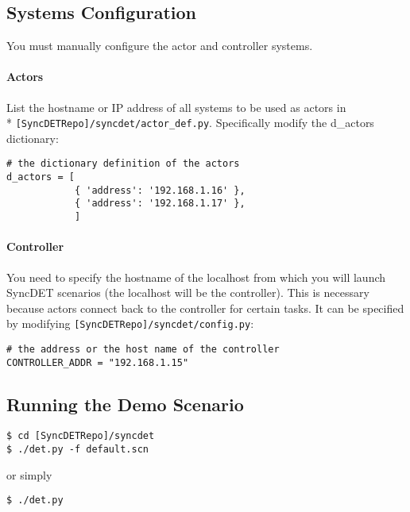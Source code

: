 \subsection{Systems Configuration}
You must manually configure the actor and controller systems. 

\paragraph{Actors} 
List the hostname or IP address of all systems to be used as actors in \\*
{\tt [SyncDETRepo]/syncdet/actor\_def.py}. Specifically modify the d\_actors
dictionary:
\begin{verbatim}
# the dictionary definition of the actors
d_actors = [
            { 'address': '192.168.1.16' },
            { 'address': '192.168.1.17' },
            ]
\end{verbatim}

\paragraph{Controller} 
You need to specify the hostname of the localhost from which you will launch
SyncDET scenarios (the localhost will be the controller). This is necessary
because actors connect back to the controller for certain tasks. It can be
specified by modifying {\tt [SyncDETRepo]/syncdet/config.py}:
\begin{verbatim}
# the address or the host name of the controller
CONTROLLER_ADDR = "192.168.1.15"
\end{verbatim}

\subsection{Running the Demo Scenario}
\begin{verbatim}
$ cd [SyncDETRepo]/syncdet
$ ./det.py -f default.scn
\end{verbatim}

or simply

\begin{verbatim}
$ ./det.py
\end{verbatim}
